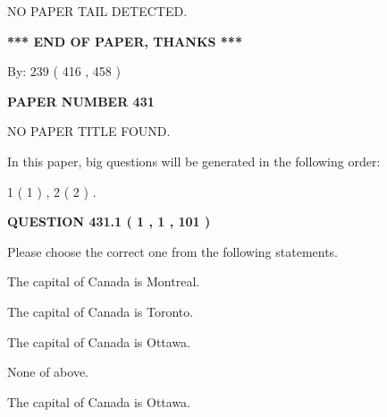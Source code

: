 \documentclass[12pt]{article}
\begin{document}
   
   
   
\vspace{2.0in} NO PAPER TAIL DETECTED.
   
   
   
   
\vspace{1.0in} 
{\textbf{\large{ *** END OF PAPER, THANKS *** }}} 
   
   
\hspace{1.0in} By: 
 239 ( 416 ,  458 )
   
   
   
   
\newpage 
\setcounter{page}{ 
   431001 } 
   
   
   
   
 {\textbf{ \Large{ PAPER NUMBER  431  }}}
   
   
\vspace{0.2in}
   
   
   
   
   
   
 NO PAPER TITLE FOUND.
   
   
   
\vspace{0.2in}
   
In this paper, big questions will be generated in the following order: 
   
   
   1 ( 1 )
 ,
   2 ( 2 )
 .
  
\vspace{0.2in}
  
{\textbf{\Large{QUESTION
431.1 
 ( 1 , 1 , 101 )
}}}
  
  
Please choose the correct one from the following statements.
 
 
The capital of Canada is Montreal.
 
 
The capital of Canada is Toronto.
 
 
The capital of Canada is Ottawa.
 
 
 None of above.
 
 
\noindent{}
 
 
The capital of Canada is Ottawa.
 
 
\noindent{}
 
\end{document}
